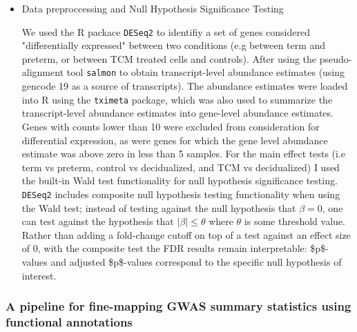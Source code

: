 \begin{itemize}
\begin{itemize}
\item Data preproccessing and Null Hypothesis Significance Testing\label{sec:org653e6dd}

We used the R packace \texttt{DESeq2} \cite{DESeq2} to identifiy a set of genes considered "differentially expressed" between two conditions (e.g between term and preterm, or between TCM treated cells and controls).
After using the pseudo-alignment tool \texttt{salmon} \cite{salmon} to obtain transcript-level abundance estimates (using gencode 19 as a source of transcripts).  The abundance estimates were loaded into R 
using the \texttt{tximeta} package, \cite{tximeta} which was also used to summarize the transcript-level abundance estimates into gene-level abundance estimates.  Genes with counts lower than 10 were excluded from consideration
for differential expression, as were genes for which the gene level abundance estimate was above zero in less than 5 samples.  For the main effect tests (i.e term vs preterm, control vs decidualized, and TCM vs decidualized) 
 I used the built-in Wald test functionality for null hypothesis significance testing.  \texttt{DESeq2} includes composite null hypothesis testing functionality when using the Wald test; instead of testing against the null hypothesis 
that \(\beta =  0\), one can test against the hypothesis that \(\lvert \beta \rvert \leq \theta\) where \(\theta\) is some threshold value.  Rather than adding a fold-change cutoff on top of a test against an effect size of 0, with the composite test the FDR results remain interpretable: 
\$p\$-values and adjusted \$p\$-values correspond to the specific null hypothesis of interest.
\end{itemize}
\end{itemize}






\subsubsection{A pipeline for fine-mapping GWAS summary statistics using functional annotations}\label{sec:org24e3fbe}




